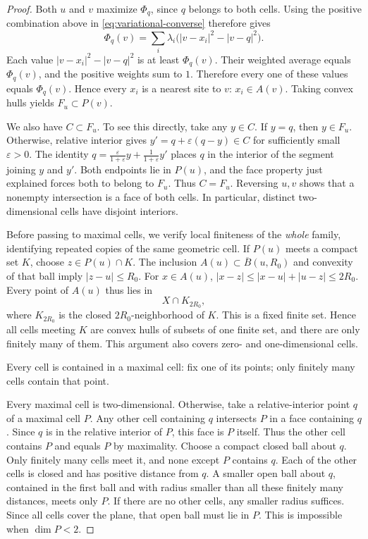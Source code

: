 \documentclass[11pt,a4paper]{article}
\theoremstyle{definition}
\theoremstyle{remark}
\begin{document}
\begin{proof}
Both $u$ and $v$ maximize $\Phi_q$, since $q$ belongs to both cells.
Using the positive combination above in
\eqref{eq:variational-converse} therefore gives
\[
\Phi_q(v)=\sum_i\lambda_i
\bigl(|v-x_i|^2-|v-q|^2\bigr).
\]
Each value $|v-x_i|^2-|v-q|^2$ is at least $\Phi_q(v)$.
Their weighted average equals $\Phi_q(v)$, and the positive weights sum
to $1$. Therefore every one of these values equals $\Phi_q(v)$.
Hence every $x_i$ is a nearest site to $v$: $x_i\in A(v)$. Taking convex hulls yields $F_u\subset P(v)$.

We also have $C\subset F_u$. To see this directly, take any $y\in C$.
If $y=q$, then $y\in F_u$. Otherwise, relative interior gives
$y'=q+\varepsilon(q-y)\in C$ for sufficiently small $\varepsilon>0$.
The identity
$q=\frac{\varepsilon}{1+\varepsilon}y+
\frac1{1+\varepsilon}y'$ places $q$ in the interior of the segment
joining $y$ and $y'$. Both endpoints lie in $P(u)$, and the face property
just explained forces both to belong to $F_u$. Thus $C=F_u$. Reversing $u,v$ shows
that a nonempty intersection is a face of both cells. In particular,
distinct two-dimensional cells have disjoint interiors.

Before passing to maximal cells, we verify local finiteness of the
\emph{whole} family, identifying repeated copies of the same geometric
cell. If $P(u)$ meets a compact set $K$, choose $z\in P(u)\cap K$.
The inclusion $A(u)\subset\overline B(u,R_0)$ and convexity of that
ball imply $|z-u|\leq R_0$. For $x\in A(u)$,
$|x-z|\leq |x-u|+|u-z|\leq2R_0$. Every point of $A(u)$ thus lies in
\[
X\cap K_{2R_0},
\]
where $K_{2R_0}$ is the closed $2R_0$-neighborhood of $K$. This is a fixed
finite set. Hence all cells meeting $K$ are convex hulls of subsets of one
finite set, and there are only finitely many of them. This argument also
covers zero- and one-dimensional cells.

Every cell is contained in a maximal cell: fix one of its points; only
finitely many cells contain that point.

Every maximal cell is
two-dimensional. Otherwise, take a relative-interior point $q$ of a
maximal cell $P$. Any other cell containing $q$ intersects $P$ in a face containing $q$.
Since $q$ is in the relative interior of $P$, this face is $P$ itself.
Thus the other cell contains $P$ and equals $P$ by maximality. Choose a compact closed ball about $q$. Only finitely many cells meet
it, and none except $P$ contains $q$. Each of the other cells is closed
and has positive distance from $q$. A smaller open ball about $q$,
contained in the first ball and with radius smaller than all these
finitely many distances, meets only $P$. If there are no other cells,
any smaller radius suffices. Since all cells cover the plane, that open
ball must lie in $P$. This is impossible when $\dim P<2$.


\end{proof}
\end{document}
